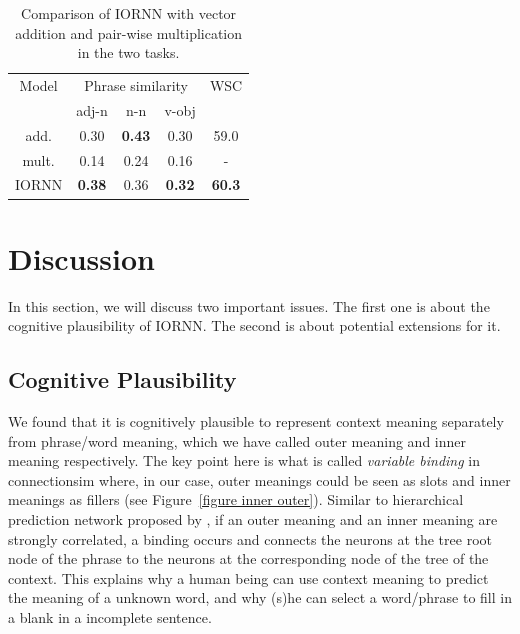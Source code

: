 \documentclass[11pt]{article}
\begin{document}
\begin{table}[!ht]
	\center
	\begin{tabular}{c|ccc|c}
	Model & \multicolumn{3}{c}{Phrase similarity} & WSC \\ 
	& adj-n & n-n & v-obj &  \\ \hline
	
	add. & 0.30 & \textbf{0.43} & 0.30 & 59.0\\ 
	mult. & 0.14 & 0.24 & 0.16 & - \\ 
	IORNN & \textbf{0.38} & 0.36 & \textbf{0.32} & \textbf{60.3} \\ \hline
	
	\end{tabular}
	\caption{Comparison of IORNN with vector addition and pair-wise multiplication
	in the two tasks.}
	\label{table summary}
\end{table}


\section{Discussion}
\label{section discussion}
In this section, we will discuss two important issues. The first one is about the cognitive 
plausibility of IORNN. The second is about potential extensions for it.

\subsection{Cognitive Plausibility}
\label{subsection cog plau}

We found that it is cognitively plausible to 
represent context meaning separately from phrase/word meaning, which we have called
outer meaning and inner meaning respectively. The key point here
is what is called \textit{variable binding} in connectionsim \cite{smolensky1990tensor} 
where, in our case, 
outer meanings could be seen as slots and inner meanings as fillers 
(see Figure~\ref{figure inner outer}). 
Similar to hierarchical prediction network proposed by , 
if an outer meaning and an inner meaning are strongly correlated, a binding occurs
and connects the neurons at the tree root node of the phrase to the neurons at the 
corresponding node of the tree of the context. This explains why a human being can use  
context meaning to predict the meaning of a unknown word, and why (s)he can select a word/phrase 
to fill in a blank in a incomplete sentence.
\end{document}
